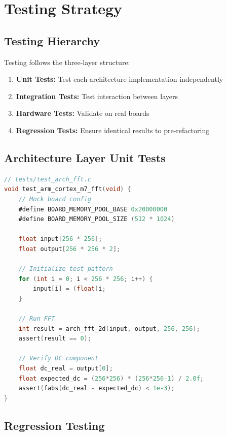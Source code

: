 \documentclass[11pt,a4paper]{article}
\begin{document}
\section{Testing Strategy}

\subsection{Testing Hierarchy}

Testing follows the three-layer structure:

\begin{enumerate}
    \item \textbf{Unit Tests:} Test each architecture implementation independently
    \item \textbf{Integration Tests:} Test interaction between layers
    \item \textbf{Hardware Tests:} Validate on real boards
    \item \textbf{Regression Tests:} Ensure identical results to pre-refactoring
\end{enumerate}

\subsection{Architecture Layer Unit Tests}

\begin{lstlisting}[language=C,caption={Example architecture unit test}]
// tests/test_arch_fft.c
void test_arm_cortex_m7_fft(void) {
    // Mock board config
    #define BOARD_MEMORY_POOL_BASE 0x20000000
    #define BOARD_MEMORY_POOL_SIZE (512 * 1024)

    float input[256 * 256];
    float output[256 * 256 * 2];

    // Initialize test pattern
    for (int i = 0; i < 256 * 256; i++) {
        input[i] = (float)i;
    }

    // Run FFT
    int result = arch_fft_2d(input, output, 256, 256);
    assert(result == 0);

    // Verify DC component
    float dc_real = output[0];
    float expected_dc = (256*256) * (256*256-1) / 2.0f;
    assert(fabs(dc_real - expected_dc) < 1e-3);
}
\end{lstlisting}

\subsection{Regression Testing}
\end{document}
